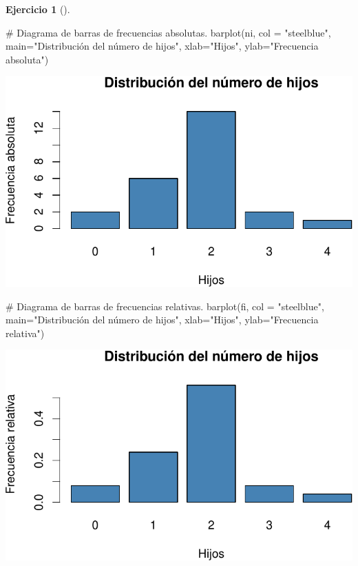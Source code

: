 \documentclass[
  a4paper,
]{scrreport}
\newenvironment{Shaded}{\begin{snugshade}}{\end{snugshade}}
\newcommand{\AttributeTok}[1]{\textcolor[rgb]{0.40,0.45,0.13}{#1}}
\newcommand{\CommentTok}[1]{\textcolor[rgb]{0.37,0.37,0.37}{#1}}
\newcommand{\FunctionTok}[1]{\textcolor[rgb]{0.28,0.35,0.67}{#1}}
\newcommand{\NormalTok}[1]{\textcolor[rgb]{0.00,0.23,0.31}{#1}}
\newcommand{\StringTok}[1]{\textcolor[rgb]{0.13,0.47,0.30}{#1}}
\theoremstyle{definition}
\newtheorem{exercise}{Ejercicio}[chapter]
\theoremstyle{remark}
\begin{document}
\begin{exercise}[]
\begin{enumerate}
\begin{tcolorbox}
\begin{Shaded}
\begin{Highlighting}[]
\CommentTok{\# Diagrama de barras de frecuencias absolutas.}
\FunctionTok{barplot}\NormalTok{(ni, }\AttributeTok{col =} \StringTok{"steelblue"}\NormalTok{, }\AttributeTok{main=}\StringTok{"Distribución del número de hijos"}\NormalTok{, }\AttributeTok{xlab=}\StringTok{"Hijos"}\NormalTok{, }\AttributeTok{ylab=}\StringTok{"Frecuencia absoluta"}\NormalTok{)}
\end{Highlighting}
\end{Shaded}

  \includegraphics{03-frecuencias-graficos_files/figure-pdf/unnamed-chunk-6-1.pdf}

\begin{Shaded}
\begin{Highlighting}[]
\CommentTok{\# Diagrama de barras de frecuencias relativas.}
\FunctionTok{barplot}\NormalTok{(fi, }\AttributeTok{col =} \StringTok{"steelblue"}\NormalTok{, }\AttributeTok{main=}\StringTok{"Distribución del número de hijos"}\NormalTok{, }\AttributeTok{xlab=}\StringTok{"Hijos"}\NormalTok{, }\AttributeTok{ylab=}\StringTok{"Frecuencia relativa"}\NormalTok{)}
\end{Highlighting}
\end{Shaded}

  \includegraphics{03-frecuencias-graficos_files/figure-pdf/unnamed-chunk-6-2.pdf}


\end{tcolorbox}
\end{enumerate}
\end{exercise}
\end{document}
